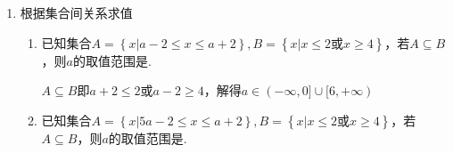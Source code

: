 \begin{enumerate}
\begin{enumerate}
\begin{jieda}
\begin{enumerate}
                \item 对任意的$m$，若$m$为奇数，则可以取$n = \dfrac{m+1}{2}$使得$\dfrac{4n-3}{8} = \dfrac{2m-1}{8}$，若$m$为偶数，则可以取$n = \dfrac{m}{2}-1$使得$\dfrac{4n+3}{8} = \dfrac{2m-1}{8}$，
                \item 对任意的$n$，可以取$m_1 = 2n+2, m_2 = 2n-2$，则$\dfrac{4n+3}{8} = \dfrac{2m_1-1}{8}, \dfrac{4n-3}{8} = \dfrac{2m_2-1}{8}$，因此$N$中的元素均在$M$中。
            \end{enumerate}
            故$M = N$
        \end{jieda}
    \end{enumerate}

    \item 根据集合间关系求值
    \begin{enumerate}
        \item 已知集合$A = \left\{x | a-2 \leq x \leq a+2\right\}, B = \left\{x|x \leq 2 \mbox{或} x \geq 4\right\}$，若$A \subseteq B$，则$a$的取值范围是\blkda[4]{$(-\infty, 0] \cup [6, +\infty)$}.
        \begin{jieda}
            $A \subseteq B$即$a+2 \leq 2$或$a-2 \geq 4$，解得$a \in (-\infty, 0] \cup [6, +\infty)$
        \end{jieda}

        \item 已知集合$A = \left\{x | 5a-2 \leq x \leq a+2\right\}, B = \left\{x|x \leq 2 \mbox{或} x \geq 4\right\}$，若$A \subseteq B$，则$a$的取值范围是\blkda[4]{$(-\infty, 0] \cup (1, +\infty)$}.
        \begin{jieda}
        \end{jieda}
        

\end{enumerate}
\end{enumerate}
